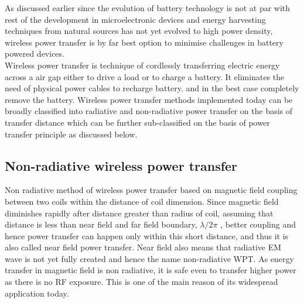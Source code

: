 \documentclass[UKenglish]{ifimaster}  %
\begin{document}
As discussed earlier since the evolution of battery technology is not at par with rest of the development in 
microelectronic devices and energy harvesting techniques from natural sources has not yet evolved to high power
density, wireless power transfer is by far best option to minimise challenges in battery powered devices. \\

Wireless power transfer is technique of cordlessly transferring electric energy across a air gap either to drive 
a load or to charge a battery. It eliminates the need of physical power cables to recharge battery. and in the 
best case completely remove the battery. Wireless power transfer methods implemented today can be broadly 
classified into radiative and non-radiative power transfer on the basis of transfer distance which can be further 
sub-classified on the basis of power transfer principle \cite{wpt_fund_std} as discussed below.\\


\subsection{Non-radiative wireless power transfer}

Non radiative method of wireless power transfer based on magnetic field coupling between two coils within the distance of coil dimension. Since magnetic field diminishes rapidly after distance greater than radius of coil, assuming that distance is less than near field and far field boundary, $\lambda /2\pi$  \cite[pp. 63]{rfid_2010}, better coupling and hence power transfer can happen only within this short distance, and thus it is also called near field power transfer. Near field also means that radiative EM wave is not yet fully created and hence the name non-radiative WPT. As energy transfer in magnetic field is non radiative, it is safe even to transfer higher power as there is no RF exposure. This is one of the main reason of its widespread application today. \\
\end{document}
